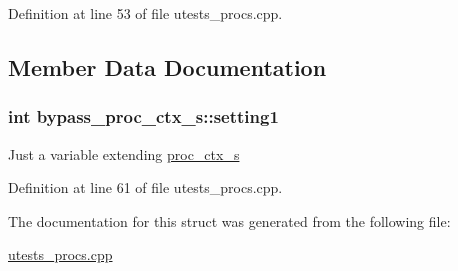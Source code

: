 Definition at line 53 of file utests\+\_\+procs.\+cpp.



\subsection{Member Data Documentation}
\subsubsection[{\texorpdfstring{setting1}{setting1}}]{\setlength{\rightskip}{0pt plus 5cm}int bypass\+\_\+proc\+\_\+ctx\+\_\+s\+::setting1}\hypertarget{structbypass__proc__ctx__s_ae96fa69398b3761717955fd130e36994}{}\label{structbypass__proc__ctx__s_ae96fa69398b3761717955fd130e36994}
Just a variable extending \hyperlink{structproc__ctx__s}{proc\+\_\+ctx\+\_\+s} 

Definition at line 61 of file utests\+\_\+procs.\+cpp.



The documentation for this struct was generated from the following file\+:\begin{DoxyCompactItemize}
\item 
\hyperlink{utests__procs_8cpp}{utests\+\_\+procs.\+cpp}\end{DoxyCompactItemize}
